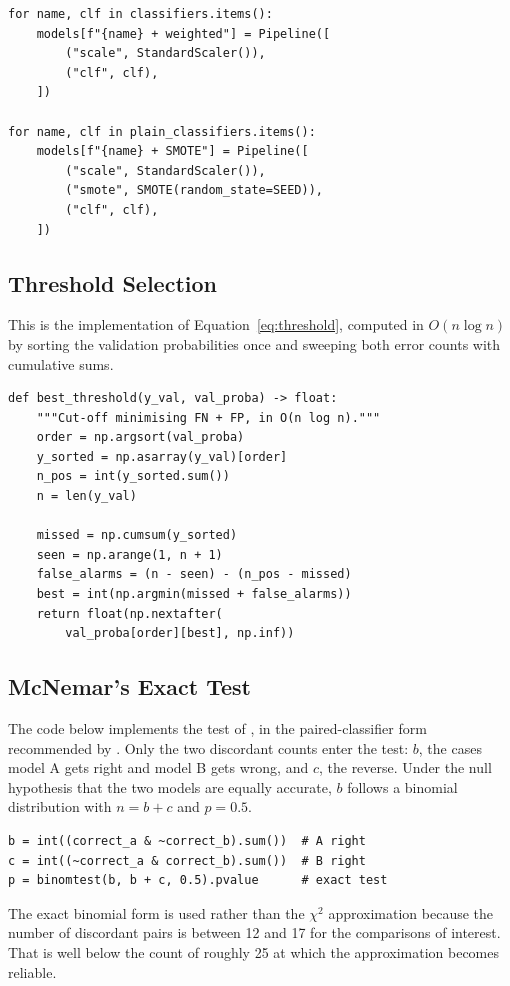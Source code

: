 {\footnotesize
\begin{verbatim}
for name, clf in classifiers.items():
    models[f"{name} + weighted"] = Pipeline([
        ("scale", StandardScaler()),
        ("clf", clf),
    ])

for name, clf in plain_classifiers.items():
    models[f"{name} + SMOTE"] = Pipeline([
        ("scale", StandardScaler()),
        ("smote", SMOTE(random_state=SEED)),
        ("clf", clf),
    ])
\end{verbatim}
}

\subsection{Threshold Selection}

This is the implementation of Equation~\ref{eq:threshold}, computed in $O(n \log n)$ by
sorting the validation probabilities once and sweeping both error counts with cumulative
sums.

{\footnotesize
\begin{verbatim}
def best_threshold(y_val, val_proba) -> float:
    """Cut-off minimising FN + FP, in O(n log n)."""
    order = np.argsort(val_proba)
    y_sorted = np.asarray(y_val)[order]
    n_pos = int(y_sorted.sum())
    n = len(y_val)

    missed = np.cumsum(y_sorted)
    seen = np.arange(1, n + 1)
    false_alarms = (n - seen) - (n_pos - missed)
    best = int(np.argmin(missed + false_alarms))
    return float(np.nextafter(
        val_proba[order][best], np.inf))
\end{verbatim}
}

\subsection{McNemar's Exact Test}

The code below implements the test of \citet{mcnemar1947note}, in the paired-classifier
form recommended by \citet{dietterich1998approximate}. Only the two discordant counts enter
the test: $b$, the cases model A gets right and model B gets wrong, and $c$, the reverse.
Under the null hypothesis that the two models are equally accurate, $b$ follows a binomial
distribution with $n = b + c$ and $p = 0.5$.

{\footnotesize
\begin{verbatim}
b = int((correct_a & ~correct_b).sum())  # A right
c = int((~correct_a & correct_b).sum())  # B right
p = binomtest(b, b + c, 0.5).pvalue      # exact test
\end{verbatim}
}

The exact binomial form is used rather than the $\chi^2$ approximation because the number of
discordant pairs is between 12 and 17 for the comparisons of interest. That is well below
the count of roughly 25 at which the approximation becomes reliable.
